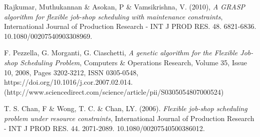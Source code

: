 \documentclass[10pt,a4paper]{scrartcl}
\begin{document}
\begin{thebibliography}{1}
   Rajkumar, Muthukannan \& Asokan, P \& Vamsikrishna, V. (2010),
   \emph{A GRASP algorithm for flexible job-shop scheduling with maintenance constraints},
    International Journal of Production Research - INT J PROD RES. 48. 6821-6836. 10.1080/00207540903308969. 

	F. Pezzella, G. Morganti, G. Ciaschetti,
	\emph{A genetic algorithm for the Flexible Job-shop Scheduling Problem},
	Computers \& Operations Research,
	Volume 35, Issue 10,
	2008,
	Pages 3202-3212,
	ISSN 0305-0548,
	https://doi.org/10.1016/j.cor.2007.02.014.
	(http://www.sciencedirect.com/science/article/pii/S0305054807000524)
	
	T. S. Chan, F \& Wong, T. C. \& Chan, LY. (2006). 
	\emph{Flexible job-shop scheduling problem under resource constraints}, 
	International Journal of Production Research - INT J PROD RES. 44. 2071-2089. 10.1080/00207540500386012. 
\end{thebibliography}
\end{document}
